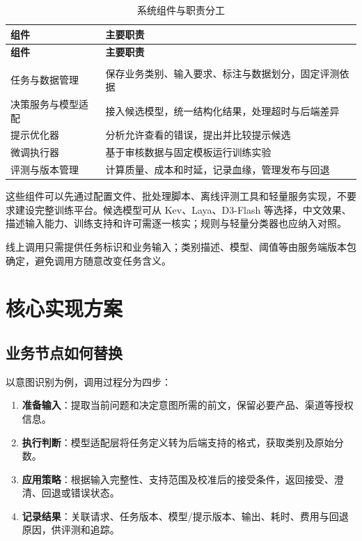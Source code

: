 \documentclass[UTF8,a4paper,11pt,fontset=windows]{ctexart}
\begin{document}
{\small\setlength{\tabcolsep}{4pt}\renewcommand{\arraystretch}{1.28}
\begin{longtable}{>{\raggedright\arraybackslash}p{0.420\dimexpr\linewidth-4\tabcolsep\relax}>{\raggedright\arraybackslash}p{0.580\dimexpr\linewidth-4\tabcolsep\relax}}
\caption{系统组件与职责分工}\label{tab:system-components}\\
\toprule
\textbf{组件} & \textbf{主要职责} \\
\midrule
\endfirsthead
\toprule
\textbf{组件} & \textbf{主要职责} \\
\midrule
\endhead
\midrule\multicolumn{2}{r}{\scriptsize\color{Muted}续下页}\\\endfoot
\bottomrule\endlastfoot
任务与数据管理 & 保存业务类别、输入要求、标注与数据划分，固定评测依据 \\
决策服务与模型适配 & 接入候选模型，统一结构化结果，处理超时与后端差异 \\
提示优化器 & 分析允许查看的错误，提出并比较提示候选 \\
微调执行器 & 基于审核数据与固定模板运行训练实验 \\
评测与版本管理 & 计算质量、成本和时延，记录血缘，管理发布与回退 \\
\end{longtable}}

这些组件可以先通过配置文件、批处理脚本、离线评测工具和轻量服务实现，不要求建设完整训练平台。候选模型可从 Kev、Laya、D3-Flash 等选择，中文效果、描述输入能力、训练支持和许可需逐一核实；规则与轻量分类器也应纳入对照。


线上调用只需提供任务标识和业务输入；类别描述、模型、阈值等由服务端版本包确定，避免调用方随意改变任务含义。


\section{核心实现方案}

\subsection{业务节点如何替换}

以意图识别为例，调用过程分为四步：


\begin{enumerate}

\item \textbf{准备输入}：提取当前问题和决定意图所需的前文，保留必要产品、渠道等授权信息。

\item \textbf{执行判断}：模型适配层将任务定义转为后端支持的格式，获取类别及原始分数。

\item \textbf{应用策略}：根据输入完整性、支持范围及校准后的接受条件，返回接受、澄清、回退或错误状态。

\item \textbf{记录结果}：关联请求、任务版本、模型/提示版本、输出、耗时、费用与回退原因，供评测和追踪。

\end{enumerate}
\end{document}
